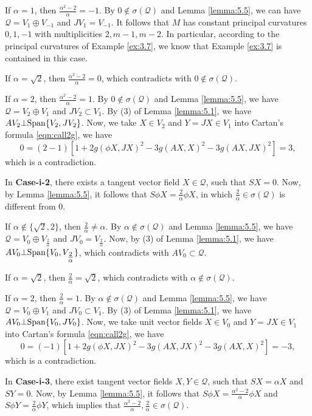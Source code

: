 \documentclass[reqno]{amsart}%
\theoremstyle{definition}
\numberwithin{equation}{section}
\begin{document}
If $\alpha=1$, then $\tfrac{\alpha^2-2}{\alpha}=-1$. By $0\notin\sigma(\mathcal{Q})$ and Lemma \ref{lemma:5.5}, we can have $\mathcal{Q}=V_1\oplus V_{-1}$ and $JV_1=V_{-1}$.
It follows that $M$ has constant principal curvatures $0,1,-1$ with multiplicities $2, m-1,m-2$.
In particular, according to the principal curvatures of
Example \ref{ex:3.7}, we know that Example \ref{ex:3.7} is contained in this case.

If $\alpha=\sqrt{2}$, then $\tfrac{\alpha^2-2}{\alpha}=0$, which contradicts with $0\notin\sigma(\mathcal{Q})$.

If $\alpha=2$, then $\tfrac{\alpha^2-2}{\alpha}=1$. By $0\notin\sigma(\mathcal{Q})$ and Lemma \ref{lemma:5.5}, we have $\mathcal{Q}=V_2\oplus V_1$ and $JV_2\subset V_1$. By (3) of Lemma \ref{lemma:5.1}, we have
$AV_2\bot{\rm Span}\{V_2,JV_2\}$. Now, we take $X\in V_2$ and $Y=JX\in V_1$ into Cartan's formula
\eqref{eqn:call2g}, we have
$$
0=(2-1)[1+2g(\phi X,JX)^2-3g(AX,X)^2-3g(AX,JX)^2]=3,
$$
which is a contradiction.



In {\bf Case-i-2}, there exists a tangent vector field $X\in\mathcal{Q}$, such that
$SX=0$. Now, by Lemma \ref{lemma:5.5}, it follows that $S\phi X=\tfrac{2}{\alpha}\phi X$, in which $\tfrac{2}{\alpha}\in\sigma(\mathcal{Q})$ is different from $0$.

If $\alpha\notin\{\sqrt{2},2\}$, then $\tfrac{2}{\alpha}\neq\alpha$. By $\alpha\notin\sigma(\mathcal{Q})$ and Lemma \ref{lemma:5.5}, we have $\mathcal{Q}=V_0\oplus V_{\tfrac{2}{\alpha}}$ and
$JV_0=V_{\tfrac{2}{\alpha}}$. Now, by (3) of Lemma \ref{lemma:5.1}, we have
$AV_0\bot{\rm Span}\{V_0,V_{\tfrac{2}{\alpha}}\}$, which contradicts with $AV_0\subset\mathcal{Q}$.

If $\alpha=\sqrt{2}$, then $\tfrac{2}{\alpha}=\sqrt{2}$, which contradicts with $\alpha\notin\sigma(\mathcal{Q})$.

If $\alpha=2$, then $\tfrac{2}{\alpha}=1$. By $\alpha\notin\sigma(\mathcal{Q})$ and Lemma \ref{lemma:5.5}, we have $\mathcal{Q}=V_0\oplus V_1$ and $JV_0\subset V_1$. By (3) of Lemma \ref{lemma:5.1}, we have
$AV_0\bot{\rm Span}\{V_0,JV_0\}$. Now, we take unit vector fields $X\in V_0$ and $Y=JX\in V_1$ into Cartan's formula \eqref{eqn:call2g}, we have
$$
0=(-1)[1+2g(\phi X,JX)^2-3g(AX,JX)^2-3g(AX,X)^2]=-3,
$$
which is a contradiction.



In {\bf Case-i-3}, there exist tangent vector fields $X,Y\in\mathcal{Q}$, such that
$SX=\alpha X$ and $SY=0$. Now, by Lemma \ref{lemma:5.5}, it follows that $S\phi X=\tfrac{\alpha^2-2}{\alpha}\phi X$ and $S\phi Y=\frac{2}{\alpha}\phi Y$,
which implies that $\tfrac{\alpha^2-2}{\alpha},\frac{2}{\alpha}\in \sigma(\mathcal{Q})$.
\end{document}
